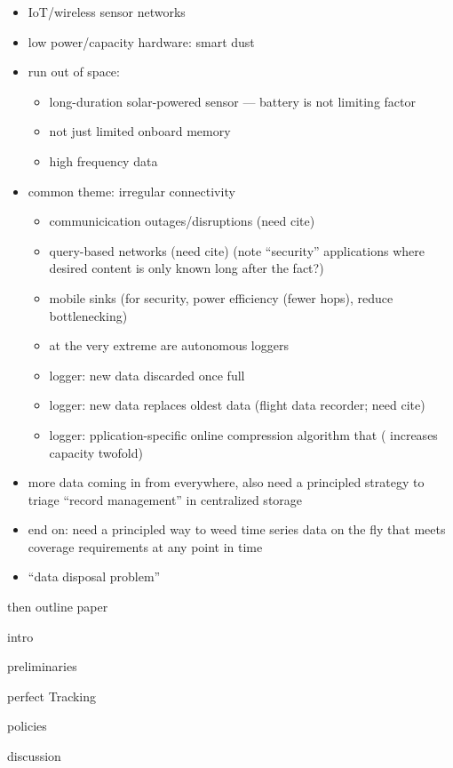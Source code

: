 \begin{itemize}
  \item IoT/wireless sensor networks
  \item low power/capacity hardware: smart dust \citep{warneke2001smart}
  \item run out of space:
  \begin{itemize}
    \item long-duration solar-powered sensor --- battery is not limiting factor \citep{corke2007long}
    \item not just limited onboard memory
    \item high frequency data \citep{luharuka2003design}
  \end{itemize}
  \item common theme: irregular connectivity
  \begin{itemize}
    \item communicication outages/disruptions (need cite)
    \item query-based networks (need cite) (note ``security'' applications where desired content is only known long after the fact?)
    \item mobile sinks \citep{jain2022survey} (for security, power efficiency (fewer hops), reduce bottlenecking)
    \item at the very extreme are autonomous loggers
    \item logger: new data discarded once full \citep{saunders1989portable,mahzan2017design}
    \item logger: new data replaces oldest data (flight data recorder; need cite)
    \item logger: pplication-specific online compression algorithm that (\citep{hadiatna2016design} increases capacity twofold)
  \end{itemize}
  \item more data coming in from everywhere, also need a principled strategy to triage ``record management'' in centralized storage
  \item end on: need a principled way to weed time series data on the fly that meets coverage requirements at any point in time
  \item ``data disposal problem''
\end{itemize}

then outline paper

intro

preliminaries

perfect Tracking

policies

discussion
